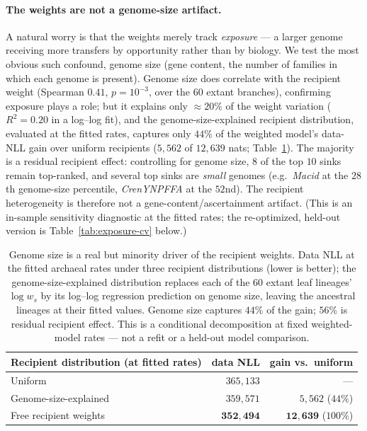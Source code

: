 \documentclass[11pt]{article}
\begin{document}
\paragraph{The weights are not a genome-size artifact.} A natural worry is that the
weights merely track \emph{exposure} --- a larger genome receiving more transfers by
opportunity rather than by biology. We test the most obvious such confound, genome size
(gene content, the number of families in which each genome is present). Genome size does
correlate with the recipient weight (Spearman $0.41$, $p{=}10^{-3}$, over the $60$ extant
branches), confirming exposure plays a role; but it explains only ${\approx}20\%$ of the
weight variation ($R^2{=}0.20$ in a log--log fit), and the genome-size-explained recipient
distribution, evaluated at the fitted rates, captures only $44\%$ of the weighted model's
data-NLL gain over uniform recipients ($5{,}562$ of $12{,}639$ nats;
Table~\ref{tab:exposure}). The majority is a residual recipient effect: controlling for
genome size, $8$ of the top $10$ sinks remain top-ranked, and several top sinks are
\emph{small} genomes (e.g.\ \emph{Macid} at the $28$th genome-size percentile,
\emph{CrenYNPFFA} at the $52$nd). The recipient heterogeneity is therefore not a
gene-content/ascertainment artifact. (This is an in-sample sensitivity diagnostic at the
fitted rates; the re-optimized, held-out version is Table~\ref{tab:exposure-cv} below.)

\begin{table}[h]\centering
\caption{Genome size is a real but minority driver of the recipient weights. Data NLL at
the fitted archaeal rates under three recipient distributions (lower is better); the
genome-size-explained distribution replaces each of the $60$ extant leaf lineages' $\log w_s$
by its log--log regression prediction on genome size, leaving the ancestral lineages at their
fitted values. Genome size captures $44\%$ of the gain; $56\%$ is residual recipient effect.
This is a conditional decomposition at fixed weighted-model rates --- not a refit or a
held-out model comparison.}
\label{tab:exposure}
\small
\begin{tabular}{lrr}
\toprule
Recipient distribution (at fitted rates) & data NLL & gain vs.\ uniform \\
\midrule
Uniform                          & $365{,}133$          & --- \\
Genome-size-explained            & $359{,}571$          & $5{,}562$ \;($44\%$) \\
Free recipient weights           & $\mathbf{352{,}494}$ & $\mathbf{12{,}639}$ \;($100\%$) \\
\bottomrule
\end{tabular}
\end{table}
\end{document}
